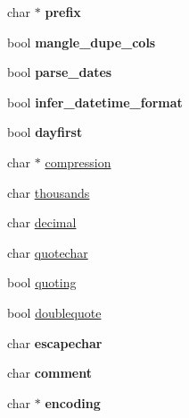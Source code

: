 \begin{DoxyCompactItemize}
\item 
char $\ast$ {\bfseries prefix}\hypertarget{structcsv__read__arg_a6e71498ed93845d85c18b38f22534912}{}\label{structcsv__read__arg_a6e71498ed93845d85c18b38f22534912}

\item 
bool {\bfseries mangle\+\_\+dupe\+\_\+cols}\hypertarget{structcsv__read__arg_af1b327239e34fba5e73a8547ed3fc94c}{}\label{structcsv__read__arg_af1b327239e34fba5e73a8547ed3fc94c}

\item 
bool {\bfseries parse\+\_\+dates}\hypertarget{structcsv__read__arg_a347329fd7569822c8e709c623c5d81aa}{}\label{structcsv__read__arg_a347329fd7569822c8e709c623c5d81aa}

\item 
bool {\bfseries infer\+\_\+datetime\+\_\+format}\hypertarget{structcsv__read__arg_ae2cf5608d4d9bb39297001bdd5b3dd4f}{}\label{structcsv__read__arg_ae2cf5608d4d9bb39297001bdd5b3dd4f}

\item 
bool {\bfseries dayfirst}\hypertarget{structcsv__read__arg_a473154c9d5d410c8090e29bcbc22e9bb}{}\label{structcsv__read__arg_a473154c9d5d410c8090e29bcbc22e9bb}

\item 
char $\ast$ \hyperlink{structcsv__read__arg_ae1f3e5ee7f08808863f66deae5924677}{compression}
\item 
char \hyperlink{structcsv__read__arg_a61219b4c6bf1f023ec0f8126914f3d6f}{thousands}
\item 
char \hyperlink{structcsv__read__arg_ad159be13cd045691a44d59de8e8d56f5}{decimal}
\item 
char \hyperlink{structcsv__read__arg_abb368471693adcc68ce5476d9b0dfad5}{quotechar}
\item 
bool \hyperlink{structcsv__read__arg_a98f0355905fb5f65ec34440ae492b454}{quoting}
\item 
bool \hyperlink{structcsv__read__arg_abc0b185723b901901c3fa38c79314537}{doublequote}
\item 
char {\bfseries escapechar}\hypertarget{structcsv__read__arg_a9c1ca9873d254e4d39c954b4212e3b25}{}\label{structcsv__read__arg_a9c1ca9873d254e4d39c954b4212e3b25}

\item 
char {\bfseries comment}\hypertarget{structcsv__read__arg_a08543da95c8adef69c2331288665b1e8}{}\label{structcsv__read__arg_a08543da95c8adef69c2331288665b1e8}

\item 
char $\ast$ {\bfseries encoding}\hypertarget{structcsv__read__arg_a12e62a3809f0ed21d7d3929256801209}{}\label{structcsv__read__arg_a12e62a3809f0ed21d7d3929256801209}

\end{DoxyCompactItemize}


